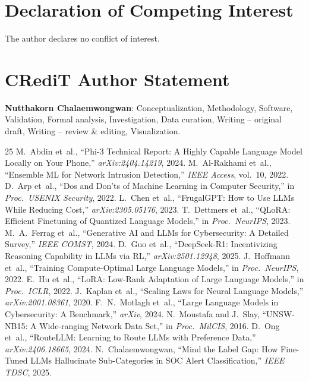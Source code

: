 \documentclass[review,3p]{elsarticle}
\begin{document}
\section*{Declaration of Competing Interest}
The author declares no conflict of interest.

\section*{CRediT Author Statement}
\textbf{Nutthakorn Chalaemwongwan}: Conceptualization, Methodology, Software, Validation, Formal analysis, Investigation, Data curation, Writing -- original draft, Writing -- review \& editing, Visualization.

\begin{thebibliography}{25}
 M.~Abdin et~al., ``Phi-3 Technical Report: A Highly Capable Language Model Locally on Your Phone,'' \emph{arXiv:2404.14219}, 2024.
 M.~Al-Rakhami et~al., ``Ensemble ML for Network Intrusion Detection,'' \emph{IEEE Access}, vol.~10, 2022.
 D.~Arp et~al., ``Dos and Don'ts of Machine Learning in Computer Security,'' in \emph{Proc.\ USENIX Security}, 2022.
 L.~Chen et~al., ``FrugalGPT: How to Use LLMs While Reducing Cost,'' \emph{arXiv:2305.05176}, 2023.
 T.~Dettmers et~al., ``QLoRA: Efficient Finetuning of Quantized Language Models,'' in \emph{Proc.\ NeurIPS}, 2023.
 M.~A.~Ferrag et~al., ``Generative AI and LLMs for Cybersecurity: A Detailed Survey,'' \emph{IEEE COMST}, 2024.
 D.~Guo et~al., ``DeepSeek-R1: Incentivizing Reasoning Capability in LLMs via RL,'' \emph{arXiv:2501.12948}, 2025.
 J.~Hoffmann et~al., ``Training Compute-Optimal Large Language Models,'' in \emph{Proc.\ NeurIPS}, 2022.
 E.~Hu et~al., ``LoRA: Low-Rank Adaptation of Large Language Models,'' in \emph{Proc.\ ICLR}, 2022.
 J.~Kaplan et~al., ``Scaling Laws for Neural Language Models,'' \emph{arXiv:2001.08361}, 2020.
 F.~N.~Motlagh et~al., ``Large Language Models in Cybersecurity: A Benchmark,'' \emph{arXiv}, 2024.
 N.~Moustafa and J.~Slay, ``UNSW-NB15: A Wide-ranging Network Data Set,'' in \emph{Proc.\ MilCIS}, 2016.
 D.~Ong et~al., ``RouteLLM: Learning to Route LLMs with Preference Data,'' \emph{arXiv:2406.18665}, 2024.
 N.~Chalaemwongwan, ``Mind the Label Gap: How Fine-Tuned LLMs Hallucinate Sub-Categories in SOC Alert Classification,'' \emph{IEEE TDSC}, 2025.

\end{thebibliography}
\end{document}
